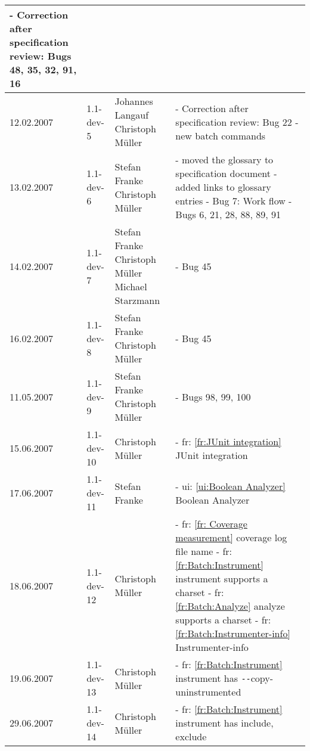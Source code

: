 {\begin{longtable}{|l|l|p{35mm}|p{71mm}|}
      - Correction after specification review: Bugs 48, 35, 32, 91, 16 \\\hline
    12.02.2007 & 1.1-dev-5 & Johannes Langauf \newline Christoph Müller  &
      - Correction after specification review: Bug 22 \newline
      - new batch commands \\\hline
    13.02.2007 & 1.1-dev-6 & Stefan Franke \newline Christoph Müller &
      - moved the glossary to specification document \newline
      - added links to glossary entries \newline
      - Bug 7: Work flow \newline
      - Bugs 6, 21, 28, 88, 89, 91\\\hline
    14.02.2007 & 1.1-dev-7 & Stefan Franke \newline Christoph Müller \newline Michael Starzmann &
      - Bug 45 \\\hline
    16.02.2007 & 1.1-dev-8 & Stefan Franke \newline Christoph Müller &
      - Bug 45 \\\hline
    11.05.2007 & 1.1-dev-9 & Stefan Franke \newline Christoph Müller &
      - Bugs 98, 99, 100 \\\hline
    15.06.2007 & 1.1-dev-10 & Christoph Müller & 
      - fr: \ref{fr:JUnit integration} JUnit integration \\\hline
    17.06.2007 & 1.1-dev-11 & Stefan Franke & 
      - ui: \ref{ui:Boolean Analyzer} Boolean Analyzer \\\hline
    18.06.2007 & 1.1-dev-12 & Christoph Müller & 
      - fr: \ref{fr: Coverage measurement} coverage log file name \newline
      - fr: \ref{fr:Batch:Instrument} instrument supports a charset  \newline
      - fr: \ref{fr:Batch:Analyze} analyze supports a charset \newline
      - fr: \ref{fr:Batch:Instrumenter-info} Instrumenter-info \\\hline
    19.06.2007 & 1.1-dev-13 & Christoph Müller & 
      - fr: \ref{fr:Batch:Instrument} instrument has \verb$--$copy-uninstrumented \\\hline
    29.06.2007 & 1.1-dev-14 & Christoph Müller & 
      - fr: \ref{fr:Batch:Instrument} instrument has include, exclude \\\hline

\end{longtable}}
